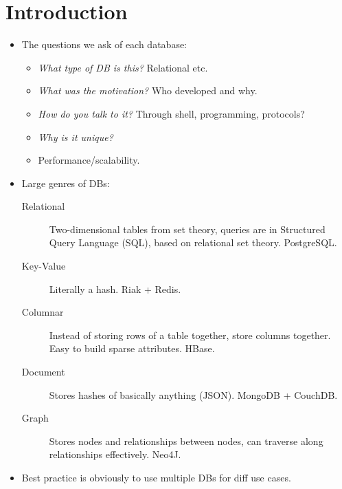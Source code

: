 \documentclass[10pt]{article}
\begin{document}
\onehalfspacing

\pagestyle{fancy}
\cfoot{\thepage/\pageref{LastPage}}

\section{Introduction}

\begin{itemize}
    \item The questions we ask of each database:
        \begin{itemize}
            \item \emph{What type of DB is this?} Relational etc.
            \item \emph{What was the motivation?} Who developed and why.
            \item \emph{How do you talk to it?} Through shell, programming,
                protocols?
            \item \emph{Why is it unique?}
            \item Performance/scalability.
        \end{itemize}
    \item Large genres of DBs:
        \begin{description}
            \item[Relational] Two-dimensional tables from set theory, queries
                are in Structured Query Language (SQL), based on relational set
                theory. PostgreSQL.\@
            \item[Key-Value] Literally a hash. Riak + Redis.
            \item[Columnar] Instead of storing rows of a table together, store
                columns together. Easy to build sparse attributes. HBase.
            \item[Document] Stores hashes of basically anything (JSON). MongoDB
                + CouchDB.\@
            \item[Graph] Stores nodes and relationships between nodes, can
                traverse along relationships effectively. Neo4J.
        \end{description}
    \item Best practice is obviously to use multiple DBs for diff use cases.
\end{itemize}
\end{document}

